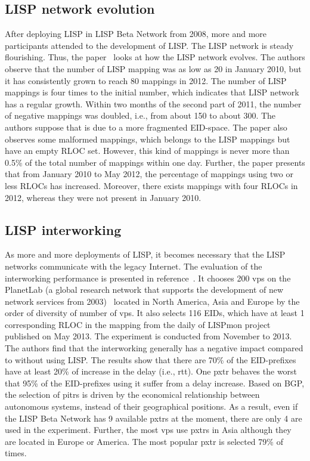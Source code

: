 \subsection{LISP network evolution}
\label{subsec:lisp_evolution}
After deploying LISP in LISP Beta Network from 2008, more and more participants attended to the development of LISP. The LISP network is steady flourishing. Thus, the paper~\cite{lispCCR} looks at how the LISP network evolves. The authors observe that the number of LISP mapping was as low as 20 in January 2010, but it has consistently grown to reach 80 mappings in 2012. The number of LISP mappings is four times to the initial number, which indicates that LISP network has a regular growth. Within two months of the second part of 2011, the number of negative mappings was doubled, i.e., from about 150 to about 300. The authors suppose that is due to a more fragmented EID-space. The paper also observes some malformed mappings, which belongs to the LISP mappings but have an empty RLOC set. However, this kind of mappings is never more than 0.5\% of the total number of mappings within one day. Further, the paper presents that from January 2010 to May 2012, the percentage of mappings using two or less RLOCs has increased. Moreover, there exists mappings with four RLOCs in 2012, whereas they were not present in January 2010.

\subsection{LISP interworking}
\label{subsec:lisp_interworking}
As more and more deployments of LISP, it becomes necessary that the LISP networks communicate with the legacy Internet. The evaluation of the interworking performance is presented in reference~\cite{coras2014performance}. It chooses 200 \acrshort{vp}s on the PlanetLab (a global research network that supports the development of new network services from 2003)~\cite{PlanetLab} located in North America, Asia and Europe by the order of diversity of number of \acrshort{vp}s. It also selects 116 EIDs, which have at least 1 corresponding RLOC in the mapping from the daily of LISPmon project~\cite{lispmon} published on May  2013. The experiment is conducted from November  to  2013. The authors find that the interworking generally has a negative impact compared to without using LISP. The results show that there are 70\% of the EID-prefixes have at least 20\% of increase in the delay (i.e., \acrfull{rtt}). One \acrshort{pxtr} behaves the worst that 95\% of the EID-prefixes using it suffer from a delay increase. Based on BGP, the selection of \acrshort{pitr}s is driven by the economical relationship between autonomous systems, instead of their geographical positions. As a result, even if the LISP Beta Network has 9 available \acrshort{pxtr}s at the moment, there are only 4 are used in the experiment. Further, the most \acrshort{vp}s use \acrshort{pxtr}s in Asia although they are located in Europe or America. The most popular \acrshort{pxtr} is selected 79\% of times.


